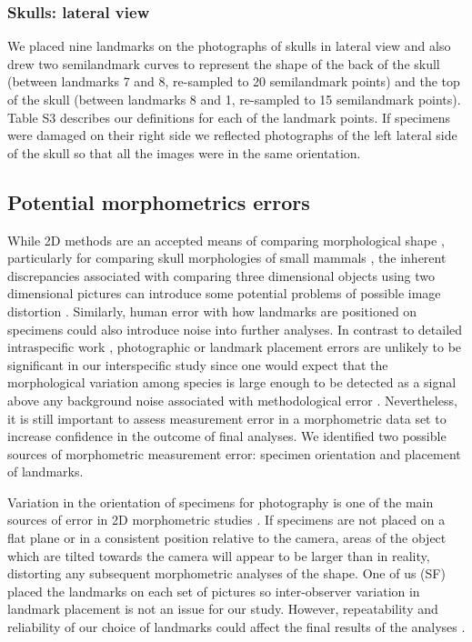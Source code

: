 \documentclass[12pt,a4paper]{article}
\begin{document}
\subsubsection{Skulls: lateral view}
\vspace*{-0.5cm}
	We placed nine landmarks on the photographs of skulls in lateral view and also drew two semilandmark curves to represent the shape of the back of the skull (between landmarks 7 and 8, re-sampled to 20 semilandmark points) and the top of the skull (between landmarks 8 and 1, re-sampled to 15 semilandmark points). Table S3 describes our definitions for each of the landmark points.
	If specimens were damaged on their right side we reflected photographs of the left lateral side of the skull so that all the images were in the same orientation.

\subsection{{Potential morphometrics errors}}
\vspace*{-0.5cm}	 
	While 2D methods are an accepted means of comparing morphological shape \citep[e.g.][]{Adams2004, Mitteroecker2009}, particularly for comparing skull morphologies of small mammals \citep[e.g.][]{Cardini2003, Panchetti2008, White2008, Barrow2008, Scalici2011}, the inherent discrepancies associated with comparing three dimensional objects using two dimensional pictures can introduce some potential problems of possible image distortion \citep{Arnqvist1998}. Similarly, human error with how landmarks are positioned on specimens could also introduce noise into further analyses.
	In contrast to detailed intraspecific work \citep[e.g.][]{Bornholdt2008, Blagojevic2011}, photographic or landmark placement errors are unlikely to be significant in our interspecific study since one would expect that the morphological variation among species is large enough to  be detected as a signal above any background noise associated with methodological error \citep{Arnqvist1998}. Nevertheless, it is still important to assess measurement error in a morphometric data set to increase confidence in the outcome of final analyses.
	We identified two possible sources of morphometric measurement error: specimen orientation and placement of landmarks.

    Variation in the orientation of specimens for photography is one of the main sources of error in 2D morphometric studies \citep{Adriaens2007}. If specimens are not placed on a flat plane or in a consistent position relative to the camera, areas of the object which are tilted towards the camera will appear to be larger than in reality, distorting any subsequent morphometric analyses of the shape. 
	One of us (SF) placed the landmarks on each set of pictures so inter-observer variation in landmark placement is not an issue for our study.  However, repeatability and reliability of our choice of landmarks could affect the final results of the analyses \citep{Arnqvist1998}.
\end{document}
